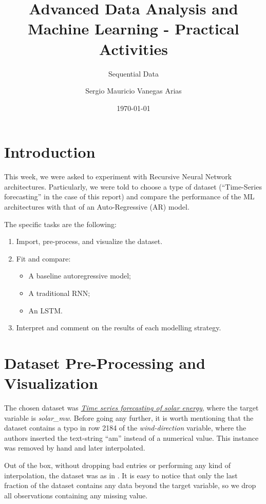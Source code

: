 \documentclass{scrartcl}
\title{Advanced Data Analysis and Machine Learning - Practical Activities}
\subtitle{Sequential Data}
\author{Sergio Mauricio Vanegas Arias}
\date{\today}
\begin{document}
\maketitle

\section{Introduction}

  This week, we were asked to experiment with Recursive Neural Network architectures. Particularly, we were told to choose a type of dataset (``Time-Series forecasting'' in the case of this report) and compare the performance of the ML architectures with that of an Auto-Regressive (AR) model.

  The specific tasks are the following:

  \begin{enumerate}
    \item Import, pre-process, and visualize the dataset.
    \item Fit and compare:
    \begin{itemize}
      \item A baseline autoregressive model;
      \item A traditional RNN;
      \item An LSTM.
    \end{itemize}
    \item Interpret and comment on the results of each modelling strategy.
  \end{enumerate}

\section{Dataset Pre-Processing and Visualization}

  The chosen dataset was \href{https://www.kaggle.com/datasets/chaitanyakumar12/time-series-forecasting-of-solar-energy/}{\emph{Time series forecasting of solar energy}}, where the target variable is \emph{solar\_mw}. Before going any further, it is worth mentioning that the dataset contains a typo in row 2184 of the \emph{wind-direction} variable, where the authors inserted the text-string ``am'' instead of a numerical value. This instance was removed by hand and later interpolated.

  Out of the box, without dropping bad entries or performing any kind of interpolation, the dataset was as in . It is easy to notice that only the last fraction of the dataset contains any data beyond the target variable, so we drop all observations containing any missing value.
\end{document}
